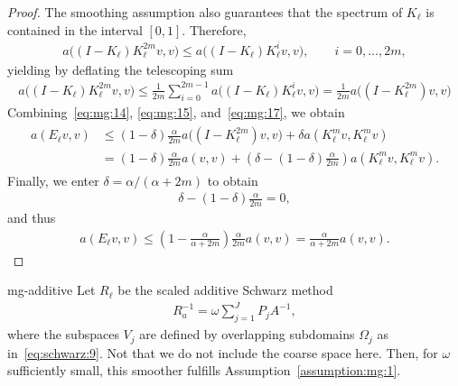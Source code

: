 \begin{proof}
  The smoothing assumption also guarantees that the spectrum of
  $K_\ell$ is contained in the interval $[0,1]$. Therefore,
  \begin{gather}
    \label{eq:mg:16}
    a\bigl((I-K_\ell) K_\ell^{2m} v,v\bigr)
    \le a\bigl((I-K_\ell) K_\ell^{i} v,v\bigr),
    \qquad i=0,\dots,2m,
  \end{gather}
  yielding by deflating the telescoping sum
  \begin{gather}
    \label{eq:mg:17}
    a\bigl((I-K_\ell) K_\ell^{2m} v,v\bigr)
    \le \frac1{2m} \sum_{i=0}^{2m-1}
    a\bigl((I-K_\ell) K_\ell^{i} v,v\bigr)
    = \frac1{2m} a\bigl((I-K_\ell^{2m}) v,v\bigr)
  \end{gather}
  Combining~\eqref{eq:mg:14}, \eqref{eq:mg:15}, and~\eqref{eq:mg:17},
  we obtain
  \begin{gather}
    \begin{split}
      a(E_\ell v,v) &\le (1-\delta)\frac\alpha{2m}
      a\bigl((I-K_\ell^{2m}) v,v\bigr)
      + \delta a(K_\ell^m v,K_\ell^m v)
      \\
      &= (1-\delta)\frac\alpha{2m} a(v,v)
      + \left(\delta - (1-\delta)\frac\alpha{2m}\right)
      a(K_\ell^m v,K_\ell^m v).
    \end{split}
  \end{gather}
  Finally, we enter $\delta=\alpha/(\alpha+2m)$ to obtain
  \begin{gather*}
    \delta - (1-\delta)\frac\alpha{2m} = 0,
  \end{gather*}
  and thus
  \begin{gather}
    \label{eq:mg:18}
    a(E_\ell v,v) \le \left(1-\frac\alpha{\alpha+2m}\right)\frac\alpha{2m}
    a(v,v) = \frac\alpha{\alpha+2m}a(v,v). 
  \end{gather}
\end{proof}

\begin{Lemma}{mg-additive}
  Let $R_\ell$ be the scaled additive Schwarz method
  \begin{gather}
    \label{eq:mg:19}
    R_a^{-1} = \omega \sum_{j=1}^J P_j A^{-1},
  \end{gather}
  where the subspaces $V_j$ are defined by overlapping subdomains
  $\Omega_j$ as in~\eqref{eq:schwarz:9}. Not that we do not include
  the coarse space here. Then, for $\omega$ sufficiently small, this
  smoother fulfills Assumption~\ref{assumption:mg:1}.
\end{Lemma}


